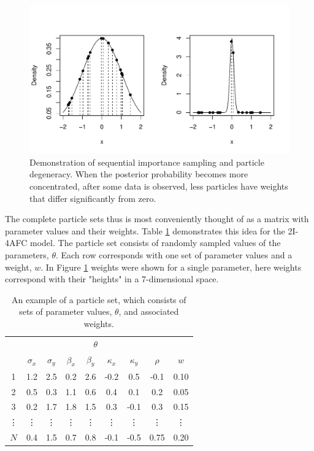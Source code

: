 \documentclass{article}\usepackage{knitr}
\begin{document}
\begin{figure}[!htb]
\begin{center}
\begin{knitrout}
\color{fgcolor}
\includegraphics[width=\maxwidth]{figure/degeneracy-1} 

\end{knitrout}
\end{center}
\caption{ Demonstration of sequential importance sampling and particle degeneracy. When the posterior probability becomes more concentrated, after some data is observed, less particles have weights that differ significantly from zero. }
\label{fig:degeneracy}
\end{figure}

The complete particle sets thus is most conveniently thought of as a matrix with parameter values and their weights. Table \ref{table:particleSet} demonstrates this idea for the 2I-4AFC model. The particle set consists of randomly sampled values of the parameters, $\theta$. Each row corresponds with one set of parameter values and a weight, $w$. In Figure \ref{fig:degeneracy} weights were shown for a single parameter, here weights correspond with their "heights" in a 7-dimensional space. 

\begin{table}[!htb]
\centering
\caption{An example of a particle set, which consists of sets of parameter values, $\theta$, and associated weights.}
\vspace{0.5cm}
\label{table:particleSet}
\begin{tabular}{ccccccccc}
\toprule

& \multicolumn{7}{c}{$\theta$}    \\
\cmidrule(lr){2-8}
& $\sigma_x$  & $\sigma_y$  & $\beta_x$   & $\beta_y$   & $\kappa_x$ & $\kappa_y$ & $\rho$   & $w$  \\
\midrule
1    & 1.2  &  2.5 &  0.2 & 2.6 & -0.2 & 0.5 & -0.1 & 0.10 \\
2    & 0.5  &  0.3 &  1.1 & 0.6 &  0.4 & 0.1 & 0.2 & 0.05 \\
3    & 0.2  &  1.7 &  1.8 & 1.5 &  0.3 & -0.1 & 0.3 & 0.15 \\
\vdots & \vdots  &  \vdots &  \vdots & \vdots & \vdots  & \vdots & \vdots  & \vdots  \\
$N$  & 0.4  &  1.5 &  0.7 & 0.8 & -0.1 & -0.5& 0.75 & 0.20 \\
\bottomrule
\end{tabular}
\end{table}
\end{document}
